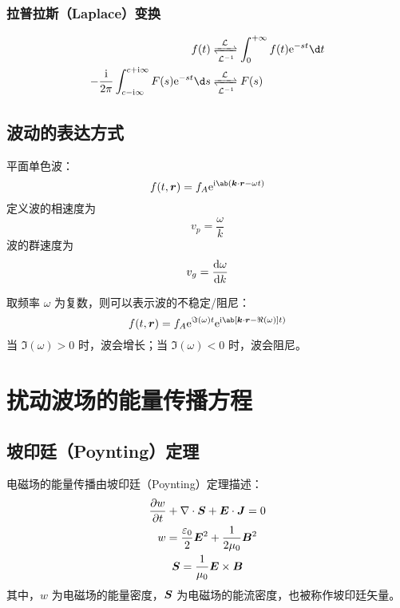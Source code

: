 \subsubsection{拉普拉斯（Laplace）变换}

\begin{equation}\begin{aligned}
f(t) &\LaplaceTs \int_0^{+\infty} f(t) \eu^{- s t} \d t \\
- \frac{\im}{2\pi}\int_{c-\im\infty}^{c+\im\infty} F(s) \eu^{- s t} \d s &\LaplaceTs F(s)\\
\end{aligned}\end{equation}

\subsection{波动的表达方式}

平面单色波：
\begin{equation}
f(t,\vector{r}) = f_A \eu^{\im\ab(\vector{k}\cdot\vector{r} - \omega t)}
\end{equation}
定义波的相速度为
\begin{equation}
v_p = \frac{\omega}{k}
\end{equation}
波的群速度为
\begin{equation}
v_g = \odv{\omega}{k}
\end{equation}

取频率 $\omega$ 为复数，则可以表示波的不稳定/阻尼：
\begin{equation}
f(t,\vector{r}) = f_A \eu^{\Im(\omega) t} \eu^{\im\ab[\vector{k}\cdot\vector{r} - \Re(\omega)] t)}
\end{equation}
当 $\Im(\omega)>0$ 时，波会增长；当 $\Im(\omega)<0$ 时，波会阻尼。

\section{扰动波场的能量传播方程}

\subsection{坡印廷（Poynting）定理}

电磁场的能量传播由坡印廷（Poynting）定理描述：
\begin{subequations}\begin{gather}
\pdv{w}{t} + \nabla \cdot {\bm{S}} + \bm{E} \cdot \bm{J} = 0 \\
w = \frac{\varepsilon_0}{2} \bm{E}^2 + \frac{1}{2\mu_0} \bm{B}^2 \\
\bm{S} = \frac{1}{\mu_0} \bm{E} \times \bm{B}
\end{gather}\end{subequations}
其中，$w$ 为电磁场的能量密度，$\bm{S}$ 为电磁场的能流密度，也被称作坡印廷矢量。

